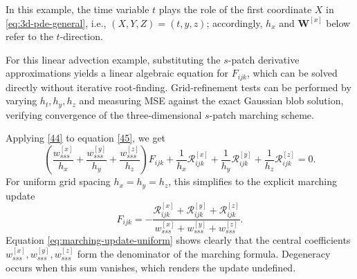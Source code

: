 \documentclass[pdflatex,sn-mathphys-num]{sn-jnl}%
\theoremstyle{thmstyleone}%
\theoremstyle{thmstyletwo}%
\theoremstyle{thmstylethree}%
\begin{document}
{In this example, the time variable $t$ plays the role of the first coordinate $X$ in \eqref{eq:3d-pde-general}, i.e., $(X,Y,Z)=(t,y,z)$; accordingly, $h_x$ and $\boldsymbol{W}^{[x]}$ below refer to the $t$-direction.

For this linear advection example, substituting the $s$-patch derivative approximations yields a linear algebraic equation for $F_{ijk}$, which can be solved directly without iterative root‑finding. Grid‑refinement tests can be performed by varying $h_t,h_y,h_z$ and measuring MSE against the exact Gaussian blob solution, verifying convergence of the three‑dimensional $s$-patch marching scheme.

Applying \eqref{44} to equation \eqref{45}, we get 
\begin{equation}
\left(\frac{w_{sss}^{[x]}}{h_x}+
\frac{w_{sss}^{[y]}}{h_y}+
\frac{w_{sss}^{[z]}}{h_z}\right)F_{ijk}+\frac{1}{h_x}\mathcal{R}_{ijk}^{[x]}+\frac{1}{h_y}\mathcal{R}_{ijk}^{[y]}+\frac{1}{h_z}\mathcal{R}_{ijk}^{[z]}=0.
\end{equation}
For uniform grid spacing $h_x=h_y=h_z$, this simplifies to the explicit marching update
\begin{equation}
F_{ijk}=-\frac{\mathcal{R}_{ijk}^{[x]}+\mathcal{R}_{ijk}^{[y]}+\mathcal{R}_{ijk}^{[z]}}{w_{sss}^{[x]}+w_{sss}^{[y]}+w_{sss}^{[z]}}.
\label{eq:marching-update-uniform}
\end{equation}
Equation \eqref{eq:marching-update-uniform} shows clearly that the central coefficients $w_{sss}^{[x]},w_{sss}^{[y]},w_{sss}^{[z]}$ form the denominator of the marching formula. Degeneracy occurs when this sum vanishes, which renders the update undefined.

}
\end{document}
